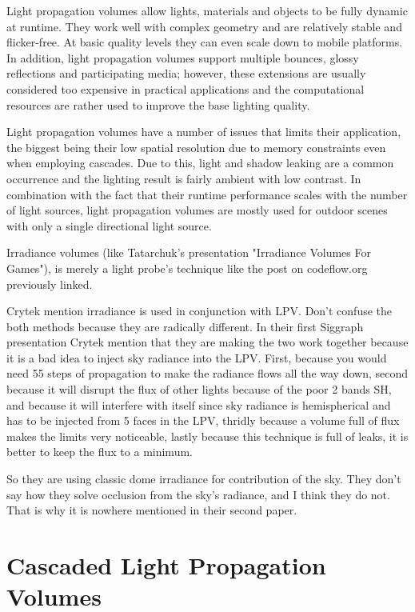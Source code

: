 Light propagation volumes allow lights, materials and objects to be fully dynamic at runtime. They work well with complex geometry and are relatively stable and flicker-free. At basic quality levels they can even scale down to mobile platforms. In addition, light propagation volumes support multiple bounces, glossy reflections and participating media; however, these extensions are usually considered too expensive in practical applications and the computational resources are rather used to improve the base lighting quality.

Light propagation volumes have a number of issues that limits their application, the biggest being their low spatial resolution due to memory constraints even when employing cascades. Due to this, light and shadow leaking are a common occurrence and the lighting result is fairly ambient with low contrast. In combination with the fact that their runtime performance scales with the number of light sources, light propagation volumes are mostly used for outdoor scenes with only a single directional light source.

Irradiance volumes (like Tatarchuk's presentation "Irradiance Volumes For Games"), is merely a light probe's technique like the post on codeflow.org previously linked.

Crytek mention irradiance is used in conjunction with LPV. Don't confuse the both methods because they are radically different. In their first Siggraph presentation Crytek mention that they are making the two work together because it is a bad idea to inject sky radiance into the LPV. First, because you would need 55 steps of propagation to make the radiance flows all the way down, second because it will disrupt the flux of other lights because of the poor 2 bands SH, and because it will interfere with itself since sky radiance is hemispherical and has to be injected from 5 faces in the LPV, thridly because a volume full of flux makes the limits very noticeable, lastly because this technique is full of leaks, it is better to keep the flux to a minimum.

So they are using classic dome irradiance for contribution of the sky. They don't say how they solve occlusion from the sky's radiance, and I think they do not. That is why it is nowhere mentioned in their second paper.

%
\section{Cascaded Light Propagation Volumes}
